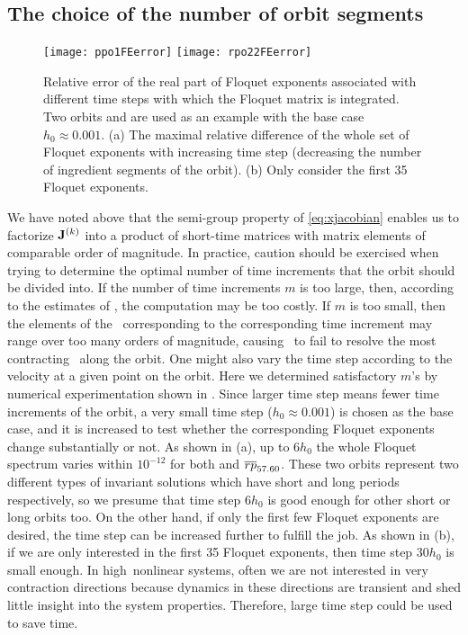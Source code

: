 \subsection{The choice of the number of orbit segments}

\begin{figure}[h]
  \centering
  \texttt{[image: ppo1FEerror]} \hfill
  \texttt{[image: rpo22FEerror]}
  \caption[Accuracy of choosing different number of orbit segments]{
    Relative error of the real part of
    Floquet exponents associated with different time steps
    with which the Floquet matrix is integrated. Two orbits 
    and  are used as an example with the base
    case $h_0 \approx 0.001$. (a) The maximal relative difference of
    the whole set of Floquet exponents with increasing time step (decreasing
    the number of ingredient segments of the orbit). (b) Only consider
    the first 35 Floquet exponents.}
  \label{fig:FEerror}
\end{figure}


We have noted above that the {semi-group property of \JacobianM}
\eqref{eq:xjacobian} enables us to factorize
$\mathbf{J}^{(k)}$ into a product of short-time matrices with matrix
elements of comparable {order of magnitude}. In practice, caution should be
exercised when trying to determine the optimal number of time increments
that the orbit should be divided into. If the number of time increments
$m$ is too large, then, according to the estimates of
, the computation may be too costly. If $m$ is too
small, then the elements of the \JacobianM\ corresponding to the
corresponding time increment may range over too many orders of magnitude,
causing \ped\ to fail to resolve the most contracting \Fv\
along the orbit. One
might also vary the time step according to the velocity at a given point
on the orbit. Here we determined satisfactory $m$'s by numerical
experimentation shown in \reffig{fig:FEerror}. Since larger time step means
fewer time increments of the orbit, a very small time step ($h_0 \approx 0.001$)
is chosen as the base case, and it is increased to test whether the
corresponding Floquet exponents change substantially or not. As shown in
\reffig{fig:FEerror} (a), up to $6h_0$ the whole Floquet spectrum varies within
$10^{-12}$ for both \PPO{10.25} and ${\overline{rp}}_{57.60}$. These
two orbits represent two different types of invariant solutions which have
short and long periods respectively,
so we presume that time step $6h_0$ is good enough
for other short or long orbits too. On the other hand, if only the first
few Floquet exponents are desired, the time step can be increased further
to fulfill the job. As shown in \reffig{fig:FEerror} (b), if we are only
interested in the first 35 Floquet exponents, then time step $30h_0$ is small
enough. In high\dmn\ nonlinear systems, often we are not interested in
very contraction
directions because dynamics in these directions are transient and shed little
insight into the system properties. Therefore, large time step could be used to
save time.





